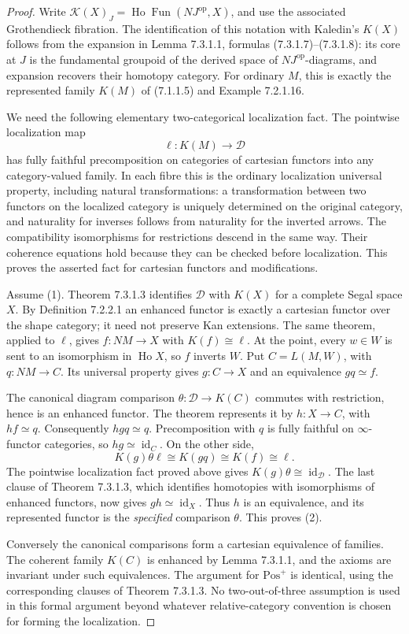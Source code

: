 \begin{proof}
Write $\mathcal K(X)_J=\operatorname{Ho}\operatorname{Fun}
(NJ^{\mathrm{op}},X)$, and use the associated Grothendieck fibration.
The identification of this notation with Kaledin's $K(X)$ follows
from the expansion in Lemma 7.3.1.1, formulas (7.3.1.7)--(7.3.1.8):
its core at $J$ is the fundamental groupoid of the derived space
of $NJ^{\mathrm{op}}$-diagrams, and expansion recovers their
homotopy category. For ordinary $M$, this is exactly the represented
family $K(M)$ of (7.1.1.5) and Example 7.2.1.16.

We need the following elementary two-categorical localization fact.
The pointwise localization map
\[
 \ell:K(M)\longrightarrow\mathcal D
\]
has fully faithful precomposition on categories of cartesian
functors into any category-valued family. In each fibre this is
the ordinary localization universal property, including natural
transformations: a transformation between two functors on the
localized category is uniquely determined on the original category,
and naturality for inverses follows from naturality for the inverted
arrows. The compatibility isomorphisms for restrictions descend in
the same way. Their coherence equations hold because they can be
checked before localization. This proves the asserted fact for
cartesian functors and modifications.

Assume (1). Theorem 7.3.1.3 identifies $\mathcal D$ with $K(X)$ for
a complete Segal space $X$. By Definition 7.2.2.1 an enhanced functor
is exactly a cartesian functor over the shape category; it need not
preserve Kan extensions. The same theorem, applied to $\ell$, gives
$f:NM\to X$ with $K(f)\cong\ell$. At the point, every $w\in W$
is sent to an isomorphism in $\operatorname{Ho}X$, so $f$ inverts
$W$. Put $C=L(M,W)$, with $q:NM\to C$. Its universal property gives
$g:C\to X$ and an equivalence $gq\simeq f$.

The canonical diagram comparison $\theta:\mathcal D\to K(C)$
commutes with restriction, hence is an enhanced functor. The theorem
represents it by $h:X\to C$, with $hf\simeq q$. Consequently
$hgq\simeq q$. Precomposition with $q$ is fully faithful on
$\infty$-functor categories, so $hg\simeq\operatorname{id}_C$.
On the other side,
\[
 K(g)\theta\ell\cong K(gq)\cong K(f)\cong\ell.
\]
The pointwise localization fact proved above gives
$K(g)\theta\cong\operatorname{id}_{\mathcal D}$. The last clause
of Theorem 7.3.1.3, which identifies homotopies with isomorphisms of
enhanced functors, now gives $gh\simeq\operatorname{id}_X$.
Thus $h$ is an equivalence, and its represented functor is the
\emph{specified} comparison $\theta$. This proves (2).

Conversely the canonical comparisons form a cartesian equivalence
of families. The coherent family $K(C)$ is enhanced by Lemma 7.3.1.1,
and the axioms are invariant under such equivalences. The argument
for $\mathrm{Pos}^{+}$ is identical, using the corresponding clauses
of Theorem 7.3.1.3. No two-out-of-three assumption is used in this
formal argument beyond whatever relative-category convention is
chosen for forming the localization.
\end{proof}

